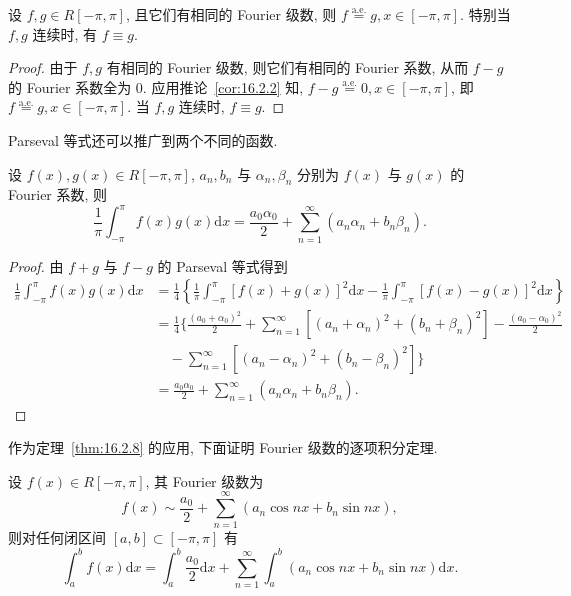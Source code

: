 \begin{corollary}[唯一性定理]\label{cor:16.2.3}
设 $f, g \in R[-\pi, \pi]$, 且它们有相同的 Fourier 级数, 则 $f \overset{\mathrm{a.e.}}{=} g, x \in [-\pi, \pi]$. 特别当 $f, g$ 连续时, 有 $f \equiv g$.
\end{corollary}

\begin{proof}
由于 $f, g$ 有相同的 Fourier 级数, 则它们有相同的 Fourier 系数, 从而 $f-g$ 的 Fourier 系数全为 $0$. 应用推论~\ref{cor:16.2.2} 知, $f-g\overset{\mathrm{a.e.}}{=}0, x\in[-\pi,\pi]$, 即 $f\overset{\mathrm{a.e.}}{=}g, x\in[-\pi,\pi]$. 当 $f,g$ 连续时, $f\equiv g$.
\end{proof}

Parseval 等式还可以推广到两个不同的函数.

\begin{theorem}\label{thm:16.2.8}
设 $f(x), g(x) \in R[-\pi, \pi]$, $a_n, b_n$ 与 $\alpha_n, \beta_n$ 分别为 $f(x)$ 与 $g(x)$ 的 Fourier 系数, 则
\[
  \frac{1}{\pi}\int_{-\pi}^{\pi}f(x)g(x)\mathrm{d}x=\frac{a_{0}\alpha_{0}}{2}+\sum_{n=1}^{\infty}(a_{n}\alpha_{n}+b_{n}\beta_{n}).
\]
\end{theorem}

\begin{proof}
由 $f+g$ 与 $f-g$ 的 Parseval 等式得到
\[
  \begin{aligned}
    \frac{1}{\pi}\int_{-\pi}^{\pi}f(x)g(x)\mathrm{d}x&=\frac{1}{4}\left\{\frac{1}{\pi}\int_{-\pi}^{\pi}\left[f(x)+g(x)\right]^{2}\mathrm{d}x-\frac{1}{\pi}\int_{-\pi}^{\pi}\left[f(x)-g(x)\right]^{2}\mathrm{d}x\right\}\\
    &=\frac{1}{4}\Biggl\{\frac{(a_{0}+\alpha_{0})^{2}}{2}+\sum_{n=1}^{\infty}\left[(a_{n}+\alpha_{n})^{2}+(b_{n}+\beta_{n})^{2}\right]-\frac{(a_{0}-\alpha_{0})^{2}}{2}\\
    &\quad-\sum_{n=1}^{\infty}\left[(a_{n}-\alpha_{n})^{2}+(b_{n}-\beta_{n})^{2}\right]\Biggr\}\\
    &=\frac{a_{0}\alpha_{0}}{2}+\sum_{n=1}^{\infty}(a_{n}\alpha_{n}+b_{n}\beta_{n}).
  \end{aligned}
\]
\end{proof}

作为定理~\ref{thm:16.2.8} 的应用, 下面证明 Fourier 级数的逐项积分定理.

\begin{theorem}[逐项积分定理]\label{thm:16.2.9}
设 $f(x) \in R[-\pi, \pi]$, 其 Fourier 级数为
\[
  f(x)\sim\frac{a_{0}}{2}+\sum_{n=1}^{\infty}\left(a_{n}\cos nx+b_{n}\sin nx\right),
\]
则对任何闭区间 $[a,b]\subset[-\pi,\pi]$ 有
\[
  \int_{a}^{b}f(x)\mathrm{d}x=\int_{a}^{b}\frac{a_{0}}{2}\mathrm{d}x+\sum_{n=1}^{\infty}\int_{a}^{b}(a_{n}\cos nx+b_{n}\sin nx)\mathrm{d}x.
\]
\end{theorem}

